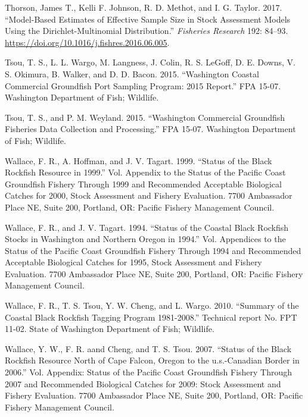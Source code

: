 \documentclass[11pt,
  english,
  letterpaper,
]{article}
\newlength{\cslhangindent}
\newenvironment{CSLReferences}[2] %
 {%
  \setlength{\parindent}{0pt}
  \ifodd #1 \everypar{\setlength{\hangindent}{\cslhangindent}}\ignorespaces\fi
  \ifnum #2 > 0
  \setlength{\parskip}{#2\baselineskip}
  \fi
 }%
 {}
\begin{document}
\begin{CSLReferences}{1}{0}
\leavevmode{}%
Thorson, James T., Kelli F. Johnson, R. D. Methot, and I. G. Taylor. 2017. {``Model-Based Estimates of Effective Sample Size in Stock Assessment Models Using the {Dirichlet}-Multinomial Distribution.''} \emph{Fisheries Research} 192: 84--93. \url{https://doi.org/10.1016/j.fishres.2016.06.005}.

\leavevmode{}%
Tsou, T. S., L. L. Wargo, M. Langness, J. Colin, R. S. LeGoff, D. E. Downs, V. S. Okimura, B. Walker, and D. D. Bacon. 2015. {``Washington Coastal Commercial Groundfish Port Sampling Program: 2015 Report.''} FPA 15-07. Washington Department of Fish; Wildlife.

\leavevmode{}%
Tsou, T. S., and P. M. Weyland. 2015. {``Washington Commercial Groundfish Fisheries Data Collection and Processing.''} FPA 15-07. Washington Department of Fish; Wildlife.

\leavevmode{}%
Wallace, F. R., A. Hoffman, and J. V. Tagart. 1999. {``Status of the Black Rockfish Resource in 1999.''} Vol. Appendix to the Status of the Pacific Coast Groundfish Fishery Through 1999 and Recommended Acceptable Biological Catches for 2000, Stock Assessment and Fishery Evaluation. 7700 Ambassador Place NE, Suite 200, Portland, OR: Pacific Fishery Management Council.

\leavevmode{}%
Wallace, F. R., and J. V. Tagart. 1994. {``Status of the Coastal Black Rockfish Stocks in Washington and Northern Oregon in 1994.''} Vol. Appendices to the Status of the Pacific Coast Groundfish Fishery Through 1994 and Recommended Acceptable Biological Catches for 1995, Stock Assessment and Fishery Evaluation. 7700 Ambassador Place NE, Suite 200, Portland, OR: Pacific Fishery Management Council.

\leavevmode{}%
Wallace, F. R., T. S. Tsou, Y. W. Cheng, and L. Wargo. 2010. {``Summary of the Coastal Black Rockfish Tagging Program 1981-2008.''} Technical report No. FPT 11-02. State of Washington Department of Fish; Wildlife.

\leavevmode{}%
Wallace, Y. W., F. R. aand Cheng, and T. S. Tsou. 2007. {``Status of the Black Rockfish Resource North of Cape Falcon, Oregon to the u.s.-Canadian Border in 2006.''} Vol. Appendix: Status of the Pacific Coast Groundfish Fishery Through 2007 and Recommended Biological Catches for 2009: Stock Assessment and Fishery Evaluation. 7700 Ambassador Place NE, Suite 200, Portland, OR: Pacific Fishery Management Council.


\end{CSLReferences}
\end{document}
